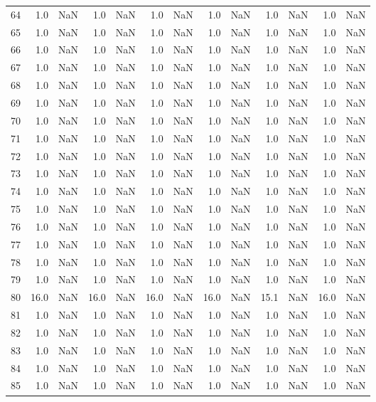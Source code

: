 \begin{tabular}{lrrrrrrrrrrrr}
64 & 1.0 & NaN & 1.0 & NaN & 1.0 & NaN & 1.0 & NaN & 1.0 & NaN & 1.0 & NaN \\
65 & 1.0 & NaN & 1.0 & NaN & 1.0 & NaN & 1.0 & NaN & 1.0 & NaN & 1.0 & NaN \\
66 & 1.0 & NaN & 1.0 & NaN & 1.0 & NaN & 1.0 & NaN & 1.0 & NaN & 1.0 & NaN \\
67 & 1.0 & NaN & 1.0 & NaN & 1.0 & NaN & 1.0 & NaN & 1.0 & NaN & 1.0 & NaN \\
68 & 1.0 & NaN & 1.0 & NaN & 1.0 & NaN & 1.0 & NaN & 1.0 & NaN & 1.0 & NaN \\
69 & 1.0 & NaN & 1.0 & NaN & 1.0 & NaN & 1.0 & NaN & 1.0 & NaN & 1.0 & NaN \\
70 & 1.0 & NaN & 1.0 & NaN & 1.0 & NaN & 1.0 & NaN & 1.0 & NaN & 1.0 & NaN \\
71 & 1.0 & NaN & 1.0 & NaN & 1.0 & NaN & 1.0 & NaN & 1.0 & NaN & 1.0 & NaN \\
72 & 1.0 & NaN & 1.0 & NaN & 1.0 & NaN & 1.0 & NaN & 1.0 & NaN & 1.0 & NaN \\
73 & 1.0 & NaN & 1.0 & NaN & 1.0 & NaN & 1.0 & NaN & 1.0 & NaN & 1.0 & NaN \\
74 & 1.0 & NaN & 1.0 & NaN & 1.0 & NaN & 1.0 & NaN & 1.0 & NaN & 1.0 & NaN \\
75 & 1.0 & NaN & 1.0 & NaN & 1.0 & NaN & 1.0 & NaN & 1.0 & NaN & 1.0 & NaN \\
76 & 1.0 & NaN & 1.0 & NaN & 1.0 & NaN & 1.0 & NaN & 1.0 & NaN & 1.0 & NaN \\
77 & 1.0 & NaN & 1.0 & NaN & 1.0 & NaN & 1.0 & NaN & 1.0 & NaN & 1.0 & NaN \\
78 & 1.0 & NaN & 1.0 & NaN & 1.0 & NaN & 1.0 & NaN & 1.0 & NaN & 1.0 & NaN \\
79 & 1.0 & NaN & 1.0 & NaN & 1.0 & NaN & 1.0 & NaN & 1.0 & NaN & 1.0 & NaN \\
80 & 16.0 & NaN & 16.0 & NaN & 16.0 & NaN & 16.0 & NaN & 15.1 & NaN & 16.0 & NaN \\
81 & 1.0 & NaN & 1.0 & NaN & 1.0 & NaN & 1.0 & NaN & 1.0 & NaN & 1.0 & NaN \\
82 & 1.0 & NaN & 1.0 & NaN & 1.0 & NaN & 1.0 & NaN & 1.0 & NaN & 1.0 & NaN \\
83 & 1.0 & NaN & 1.0 & NaN & 1.0 & NaN & 1.0 & NaN & 1.0 & NaN & 1.0 & NaN \\
84 & 1.0 & NaN & 1.0 & NaN & 1.0 & NaN & 1.0 & NaN & 1.0 & NaN & 1.0 & NaN \\
85 & 1.0 & NaN & 1.0 & NaN & 1.0 & NaN & 1.0 & NaN & 1.0 & NaN & 1.0 & NaN \\

\end{tabular}
